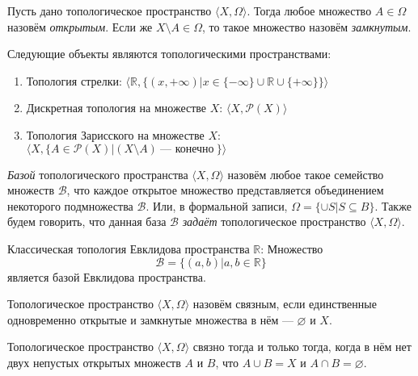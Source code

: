 \begin{definition} Пусть дано топологическое пространство $\langle X, \Omega \rangle$.
Тогда любое множество $A \in \Omega$ назовём \emph{открытым}. Если же $X \setminus A \in \Omega$, 
то такое множество назовём \emph{замкнутым}.
\end{definition}

\begin{theorem} Следующие объекты являются топологическими пространствами:
\begin{enumerate}
\item Топология стрелки: $\langle \mathbb{R}, \{(x,+\infty) | x \in \{-\infty\}\cup\mathbb{R}\cup\{+\infty\}\} \rangle$
\item Дискретная топология на множестве $X$: $\langle X, {\mathcal{P}}(X) \rangle$
\item Топология Зарисского на множестве $X$: $\langle X, \{ A \in {\mathcal{P}}(X) | (X \setminus A) ~\textrm{--- конечно}~\} \rangle$
\end{enumerate}
\end{theorem}

\begin{definition} \emph{Базой} топологического пространства $\langle X, \Omega \rangle$ назовём
любое такое семейство множеств $\mathcal{B}$, что каждое открытое множество представляется
объединением некоторого подмножества $\mathcal{B}$. Или, в формальной записи,
$\Omega = \{\cup S | S \subseteq B\}$.
Также будем говорить, что данная база $\mathcal{B}$ \emph{задаёт} топологическое 
пространство $\langle X, \Omega \rangle$.
\end{definition}

\begin{theorem} Классическая топология Евклидова пространства $\mathbb{R}$:
    Множество $$\mathcal{B} = \{(a,b)|a,b\in \mathbb{R}\}$$ является базой Евклидова пространства.
\end{theorem}

\begin{definition} Топологическое пространство $\langle X, \Omega \rangle$ назовём 
связным, если единственные одновременно открытые и замкнутые множества в нём --- $\varnothing$ и $X$.
\end{definition}

\begin{theorem} Топологическое пространство $\langle X, \Omega \rangle$ связно тогда и только тогда, 
когда в нём нет двух непустых открытых множеств $A$ и $B$, что $A \cup B = X$ и $A \cap B = \varnothing$.
\end{theorem}

